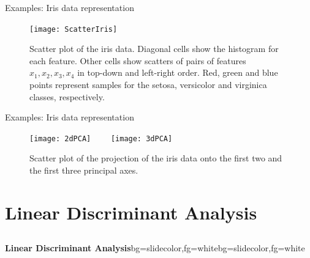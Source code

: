 
\begin{frame}{Examples: Iris data representation}
\begin{figure}
\texttt{[image: ScatterIris]}
\caption{Scatter plot of the iris data. Diagonal cells show the histogram for each feature. Other cells show scatters of pairs of features $x_1, x_2, x_3, x_4$ in
top-down and left-right order. Red, green and blue points represent samples for the setosa, versicolor and virginica classes, respectively.}
\end{figure}
\end{frame}

\begin{frame}{Examples: Iris data representation}
\begin{figure}
\texttt{[image: 2dPCA]}~~~~
\texttt{[image: 3dPCA]}
\caption{Scatter plot of the projection of the iris data onto the first two and the first three principal axes.}
\end{figure}
\end{frame}

\section[LDA]{Linear Discriminant Analysis}
\subsection{}

\begin{frame}{}
\begin{variableblock}{\centering \Large \textbf{\vspace{4pt}\newline Linear Discriminant Analysis\vspace{4pt}}}{bg=slidecolor,fg=white}{bg=slidecolor,fg=white}
\end{variableblock}
\end{frame}

